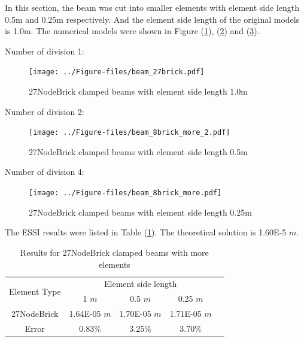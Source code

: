 \documentclass[fleqn,11pt]{article}
\begin{document}
\newpage
In this section, the beam was cut into smaller elements with element side length 0.5m and 0.25m respectively. And the element side length of the original models is 1.0m. The numerical models were shown in Figure (\ref{fig 27NodeBrick clamped beams with element side length 1.0m}), (\ref{fig 27NodeBrick clamped beams with element side length 0.5m}) and (\ref{fig 27NodeBrick clamped beams with element side length 0.25m}). 

Number of division 1:

\begin{figure}[H]
  \centering
  \texttt{[image: ../Figure-files/beam\_27brick.pdf]}
  \caption{27NodeBrick clamped beams with element side length 1.0m}
  \label{fig 27NodeBrick clamped beams with element side length 1.0m}
\end{figure}

Number of division 2:

\begin{figure}[H]
  \centering
  \texttt{[image: ../Figure-files/beam\_8brick\_more\_2.pdf]}
  \caption{27NodeBrick clamped beams with element side length 0.5m}
  \label{fig 27NodeBrick clamped beams with element side length 0.5m}
\end{figure}

Number of division 4:

\begin{figure}[H]
  \centering
  \texttt{[image: ../Figure-files/beam\_8brick\_more.pdf]}
  \caption{27NodeBrick clamped beams with element side length 0.25m}
  \label{fig 27NodeBrick clamped beams with element side length 0.25m}
\end{figure}


The ESSI results were listed in Table (\ref{table Results for 27NodeBrick clamped beams with more elements}). 
The theoretical solution is 1.60E-5 $m$. 

\begin{table}[H]
  \centering
  \caption{Results for 27NodeBrick clamped beams with more elements}
  \label{table Results for 27NodeBrick clamped beams with more elements}
  \begin{tabular}{|c|c|c|c|c|}
    \hline 
    \multirow{2}{*}{Element Type} 
       & \multicolumn{3}{|c|}{Element side length} \\ \cline{2-4}
       & 1 $m$ & 0.5 $m$ & 0.25 $m$ \\                              \hline
27NodeBrick & 1.64E-05 $m$  & 1.70E-05 $m$ & 1.71E-05 $m$ \\ \hline
Error       & 0.83\%   & 3.25\%   & 3.70\%     \\ \hline
  \end{tabular}
\end{table}
\end{document}
